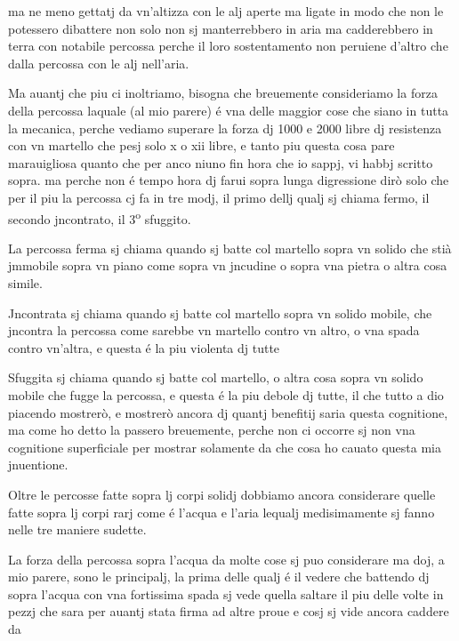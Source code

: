 \documentclass[11pt,a4paper]{article}
\begin{document}

ma ne meno gettatj da vn'altizza con le alj aperte ma ligate in modo che non le potessero dibattere non solo non sj manterrebbero in aria ma cadderebbero in terra con notabile percossa  perche il loro sostentamento non peruiene d'altro che dalla percossa con le alj nell'aria.

Ma auantj che piu ci inoltriamo, bisogna che breuemente consideriamo la forza della percossa laquale (al mio parere) é vna delle maggior cose che siano in tutta la mecanica, perche vediamo superare la forza dj 1000 e 2000 libre dj resistenza con vn martello che pesj solo x o xii libre, e tanto piu questa cosa pare marauigliosa quanto che per anco niuno fin hora che io sappj, vi habbj scritto sopra. ma perche non é tempo hora dj farui sopra lunga digressione dirò solo che per il piu la percossa cj fa in tre modj, il primo dellj qualj sj chiama fermo, il secondo jncontrato, il 3\textsuperscript{o} sfuggito.

La percossa ferma sj chiama quando sj batte col martello sopra vn solido che stià jmmobile sopra vn piano come sopra vn jncudine o sopra vna pietra o altra cosa simile.

Jncontrata sj chiama quando sj batte col martello sopra vn solido mobile, che jncontra la percossa come sarebbe vn martello contro vn altro, o vna spada contro vn'altra, e questa é la piu violenta dj tutte

Sfuggita sj chiama quando sj batte col martello, o altra cosa sopra vn solido mobile che fugge la percossa, e questa é la piu debole dj tutte, il che tutto a dio piacendo mostrerò, e mostrerò ancora dj quantj benefitij saria questa cognitione, ma come ho detto la passero breuemente, perche non ci occorre sj non vna cognitione superficiale per mostrar solamente da che cosa ho cauato questa mia jnuentione.

Oltre le percosse fatte sopra lj corpi solidj dobbiamo ancora considerare quelle fatte sopra lj corpi rarj come é l'acqua e l'aria lequalj medisimamente sj fanno nelle tre maniere sudette.

La forza della percossa sopra l'acqua da molte cose sj puo considerare ma doj, a mio parere, sono le principalj, la prima delle qualj é il vedere che battendo dj  sopra l'acqua con vna fortissima spada sj vede quella saltare il piu delle volte in pezzj che sara per auantj stata firma ad altre proue e cosj sj vide ancora caddere da
\end{document}
